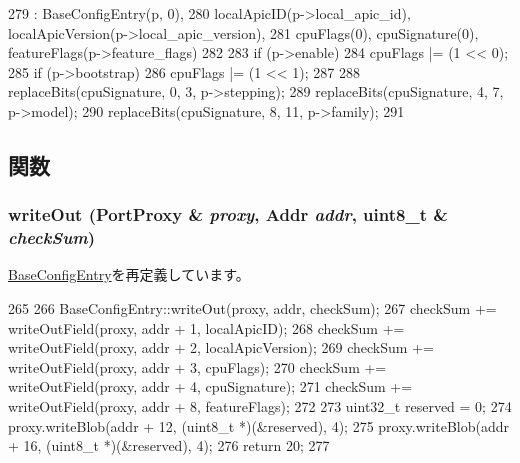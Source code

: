 \begin{DoxyCode}
279                                             : BaseConfigEntry(p, 0),
280     localApicID(p->local_apic_id), localApicVersion(p->local_apic_version),
281     cpuFlags(0), cpuSignature(0), featureFlags(p->feature_flags)
282 {
283     if (p->enable)
284         cpuFlags |= (1 << 0);
285     if (p->bootstrap)
286         cpuFlags |= (1 << 1);
287 
288     replaceBits(cpuSignature, 0, 3, p->stepping);
289     replaceBits(cpuSignature, 4, 7, p->model);
290     replaceBits(cpuSignature, 8, 11, p->family);
291 }
\end{DoxyCode}


\subsection{関数}
\hypertarget{classX86ISA_1_1IntelMP_1_1Processor_a5fffc1006b1f28bd779d83ffbe213b4f}{
\subsubsection[{writeOut}]{ writeOut ({\bf PortProxy} \& {\em proxy}, \/  {\bf Addr} {\em addr}, \/  uint8\_\-t \& {\em checkSum})}}
\label{classX86ISA_1_1IntelMP_1_1Processor_a5fffc1006b1f28bd779d83ffbe213b4f}


\hyperlink{classX86ISA_1_1IntelMP_1_1BaseConfigEntry_a5fffc1006b1f28bd779d83ffbe213b4f}{BaseConfigEntry}を再定義しています。


\begin{DoxyCode}
265 {
266     BaseConfigEntry::writeOut(proxy, addr, checkSum);
267     checkSum += writeOutField(proxy, addr + 1, localApicID);
268     checkSum += writeOutField(proxy, addr + 2, localApicVersion);
269     checkSum += writeOutField(proxy, addr + 3, cpuFlags);
270     checkSum += writeOutField(proxy, addr + 4, cpuSignature);
271     checkSum += writeOutField(proxy, addr + 8, featureFlags);
272 
273     uint32_t reserved = 0;
274     proxy.writeBlob(addr + 12, (uint8_t *)(&reserved), 4);
275     proxy.writeBlob(addr + 16, (uint8_t *)(&reserved), 4);
276     return 20;
277 }
\end{DoxyCode}


